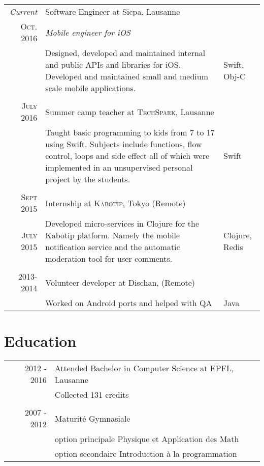 \documentclass[a4paper,10pt]{article} %
\begin{document}
\begin{tabular}{r|p{9.3cm}|l}
\emph{Current} & Software Engineer at Sicpa, Lausanne\\
\textsc{Oct. 2016} & \emph{Mobile engineer for iOS}\\ 
& \footnotesize{Designed, developed and maintained internal and public APIs and libraries for iOS. Developed and maintained small and medium scale mobile applications.} & Swift, Obj-C\\
\multicolumn{2}{c}{} \\

\textsc{July 2016} & Summer camp teacher at \textsc{TechSpark}, Lausanne \emph{}\\
& \footnotesize{Taught basic programming to kids from 7 to 17 using Swift. Subjects include functions, flow control, loops and side effect all of which were implemented in an unsupervised personal project by the students.} & Swift\\
\multicolumn{2}{c}{}\\


\textsc{Sept 2015} & Internship at \textsc{Kabotip}, Tokyo (Remote) \emph{}\\
\textsc{July 2015} & \footnotesize{Developed micro-services in Clojure for the Kabotip platform. Namely the mobile notification service and the automatic moderation tool for user comments.} & Clojure, Redis\\
\multicolumn{2}{c}{}\\


\textsc{2013-2014} & Volunteer developer at Dischan, (Remote)\\
& \footnotesize{Worked on Android ports and helped with QA} & Java
\end{tabular}


\section{Education}

\begin{tabular}{rl}	
2012 - 2016 & Attended Bachelor in Computer Science at EPFL, Lausanne\\
& \footnotesize{Collected 131 credits}\\
\multicolumn{2}{c}{}\\


2007 - 2012 & Maturité Gymnasiale\\ & option principale Physique et Application des Math\\ & option secondaire Introduction à la programmation\\
\end{tabular}
\end{document}
